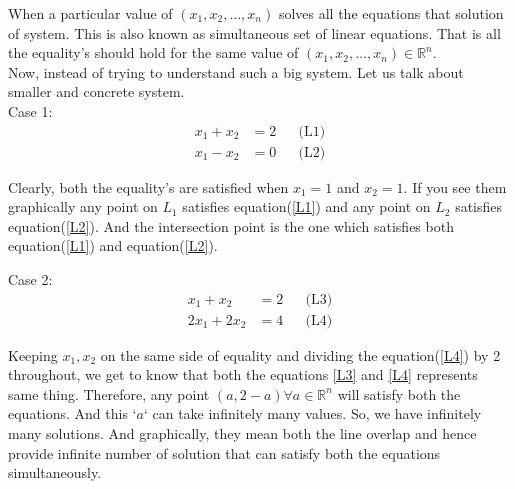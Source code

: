 \documentclass{article}
\begin{document}
When a particular value of \((x_1, x_2, \ldots, x_n)\) solves all the equations that solution of system. This is also known as simultaneous set of linear equations. That is all the equality's should hold for the same value of \((x_1, x_2, \ldots, x_n) \in \mathbb{R}^n\).\\

Now, instead of trying to understand such a big system. Let us talk about smaller and concrete system.\\
Case 1:\\
\begin{align}
    x_1 + x_2 &= 2 &&  \text{(L1)}\label{L1}\\
    x_1 - x_2 &= 0 &&  \text{(L2)}\label{L2}
\end{align}

Clearly, both the equality's are satisfied when $x_1 = 1$ and $x_2 = 1$. If you see them graphically any point on \(L_1\) satisfies equation(\ref{L1}) and any point on \(L_2\) satisfies equation(\ref{L2}). And the intersection point is the one which satisfies both equation(\ref{L1}) and equation(\ref{L2}).\\


Case 2:\\

\begin{align}
    x_1 + x_2 &= 2 &&  \text{(L3)}\label{L3}\\
    2x_1 + 2x_2&= 4 &&  \text{(L4)}\label{L4}
\end{align}

Keeping $x_1, x_2$ on the same side of equality and dividing the equation(\ref{L4}) by 2 throughout, we get to know that both the equations \ref{L3} and \ref{L4} represents same thing. Therefore, any point $(a, 2-a) \forall a \in \mathbb{R}^n$ will satisfy both the equations. And this `$a$` can take infinitely many values. So, we have infinitely many solutions. And graphically, they mean both the line overlap and hence provide infinite number of solution that can satisfy both the equations simultaneously.\\
\end{document}
